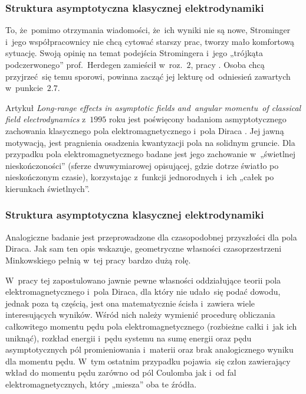 \documentclass[10pt,t]{beamer}
\begin{document}
\begin{frame}
  \frametitle{Struktura asymptotyczna klasycznej elektrodynamiki}


  To, że~pomimo otrzymania wiadomości, że~ich wyniki nie są nowe,
  Strominger i~jego współpracownicy nie chcą cytować starszy prac,
  tworzy mało komfortową sytuację. Swoją opinię na temat podejścia
  Stromingera i~jego „trójkąta podczerwonego” prof.~Herdegen zamieścił
  w~roz.~$2$, pracy
  \parencite{Herdegen-Infrared-structure-beyond-locality-ETC-Ver-2024}.
  Osoba chcą przyjrzeć~się temu sporowi, powinna zacząć jej lekturę
  od~odniesień zawartych w~punkcie~$2.7$.

  Artykuł 
  {\textit{Long-range effects in asymptotic fields and~angular momentu~of
      classical field electrodynamics}} z~$1995$ roku jest poświęcony
  badaniom asmyptotycznego zachowania klasycznego pola elektromagnetycznego
  i~pola Diraca
  \parencite{Herdegen-Long-range-effects-in-asymptotic-ETC-Pub-1995}.
  Jej jawną motywacją, jest pragnienia osadzenia kwantyzacji pola na
  solidnym gruncie. Dla przypadku pola elektromagnetycznego
  badane jest jego zachowanie w~„świetlnej nieskończoności” (sferze
  dwuwymiarowej opisującej, gdzie dotrze światło po nieskończonym czasie),
  korzystając z~funkcji jednorodnych i~ich „całek po kierunkach świetlnych”.

\end{frame}





\begin{frame}
  \frametitle{Struktura asymptotyczna klasycznej elektrodynamiki}


  Analogiczne badanie jest przeprowadzone dla czasopodobnej przyszłości dla
  pola Diraca. Jak sam ten opis wskazuje, geometryczne własności
  czasoprzestrzeni Minkowskiego pełnią w~tej pracy bardzo dużą rolę.

  W~pracy tej zapostulowano jawnie pewne własności oddziałujące teorii pola
  elektromagnetycznego i~pola Diraca, dla który nie udało~się podać dowodu,
  jednak poza tą częścią, jest ona matematycznie ścisła i~zawiera
  wiele interesujących wyników. Wśród nich należy wymienić procedurę
  obliczania całkowitego momentu pędu
  pola elektromagnetycznego (rozbieżne całki i~jak ich uniknąć), rozkład
  energii i~pędu systemu na sumę energii oraz pędu asymptotycznych pól
  promieniowania i~materii oraz brak analogicznego wyniku dla momentu pędu.
  W~tym ostatnim przypadku pojawia~się człon zawierający wkład do momentu
  pędu zarówno od pól Coulomba jak i~od fal elektromagnetycznych,
  który „miesza” oba te źródła.


\end{frame}
\end{document}
